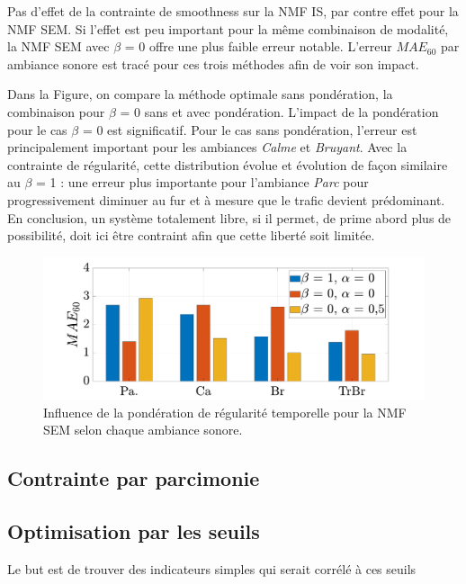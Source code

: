 Pas d'effet de la contrainte de smoothness sur la NMF IS, par contre effet pour la NMF SEM. Si l'effet est peu important pour la même combinaison de modalité, la NMF SEM avec $\beta$ = 0 offre une plus faible erreur notable. L'erreur $MAE_{60}$ par ambiance sonore est tracé pour ces trois méthodes afin de voir son impact.



Dans la Figure, on compare la méthode optimale sans pondération, la combinaison pour $\beta$ = 0 sans et avec pondération. L'impact de la pondération pour le cas $\beta$ = 0 est significatif. Pour le cas sans pondération, l'erreur est principalement important pour les ambiances \textit{Calme} et \textit{Bruyant}. Avec la contrainte de régularité, cette distribution évolue et évolution de façon similaire au $\beta$ = 1 : une erreur plus importante pour l'ambiance \textit{Parc} pour progressivement diminuer au fur et à mesure que le trafic devient prédominant.
En conclusion, un système totalement libre, si il permet, de prime abord plus de possibilité, doit ici être contraint afin que cette liberté soit limitée. 

\begin{figure}[h!]
\centering
\includegraphics[width=.9\linewidth]{./figures/resultats/grafic_smooth_bar.pdf}
\caption{Influence de la pondération de régularité temporelle pour la NMF SEM selon chaque ambiance sonore.}
\end{figure}




\subsection{Contrainte par parcimonie}



\subsection{Optimisation par les seuils}



Le but est de trouver des indicateurs simples qui serait corrélé à ces seuils


%
